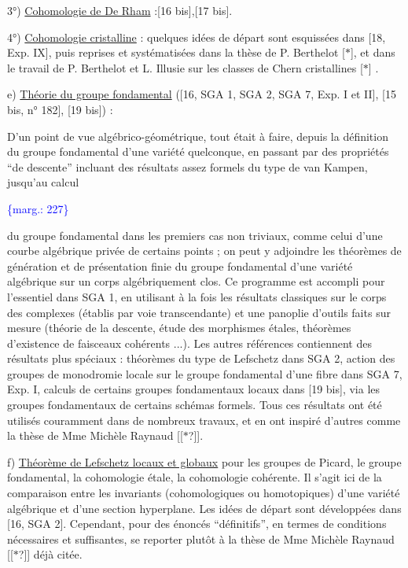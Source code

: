 \documentclass[11pt]{article}
\newcommand{\scanpage}[1]{\par\bigskip\noindent{\small\sffamily[scan #1]}\par}
\newcommand{\mspage}[1]{{\small\sffamily[p.\,#1]}}
\newcommand{\margin}[1]{\textcolor{blue}{\{\textsf{marg.:} #1\}}}
\newcommand{\uline}[1]{\underline{#1}}
\newcommand{\unsure}[1]{[#1?]}
\begin{document}
3°) \uline{Cohomologie de De Rham} :[16 bis],[17 bis].

4°) \uline{Cohomologie cristalline} : quelques idées de
départ sont esquissées dans [18, Exp. IX], puis reprises
et systématisées dans la thèse de P. Berthelot [$*$],
et dans le travail de P. Berthelot et L. Illusie sur
les classes de Chern cristallines [$*$] .

e) \uline{Théorie du groupe fondamental} ([16, SGA 1, SGA 2,
SGA 7, Exp. I et II], [15 bis, n° 182], [19 bis]) :

D'un point de vue algébrico-géométrique,
tout était à faire, depuis la définition du groupe
fondamental d'une variété quelconque, en passant par
des propriétés ``de descente'' incluant des résultats
assez formels du type de van Kampen, jusqu'au calcul

\margin{227}

\clearpage
\scanpage{119/228}
\mspage{. 15 .}

du groupe fondamental dans les premiers cas non triviaux,
comme celui d'une courbe algébrique privée de certains
points ; on peut y adjoindre les théorèmes de génération
et de présentation finie du groupe fondamental d'une
variété algébrique sur un corps algébriquement clos.
Ce programme est accompli pour l'essentiel dans SGA 1,
en utilisant à la fois les résultats classiques sur le
corps des complexes (établis par voie transcendante)
et une panoplie d'outils faits sur mesure (théorie de
la descente, étude des morphismes étales, théorèmes
d'existence de faisceaux cohérents ...). Les autres
références contiennent des résultats plus spéciaux :
théorèmes du type de Lefschetz dans SGA 2, action des
groupes de monodromie locale sur le groupe fondamental
d'une fibre dans SGA 7, Exp. I, calculs de certains
groupes fondamentaux locaux dans [19 bis], via les groupes
fondamentaux de certains schémas formels. Tous ces
résultats ont été utilisés couramment dans de nombreux
travaux, et en ont inspiré d'autres comme la thèse de
Mme Michèle Raynaud [\unsure{$\ast$}].

f) \uline{Théorème de Lefschetz locaux et globaux} pour les
groupes de Picard, le groupe fondamental, la cohomologie
étale, la cohomologie cohérente. Il s'agit ici de la
comparaison entre les invariants (cohomologiques ou
homotopiques) d'une variété algébrique et d'une section
hyperplane. Les idées de départ sont développées dans
[16, SGA 2]. Cependant, pour des énoncés ``définitifs'',
en termes de conditions nécessaires et suffisantes, se
reporter plutôt à la thèse de Mme Michèle Raynaud [\unsure{$\ast$}]
déjà citée.
\end{document}
